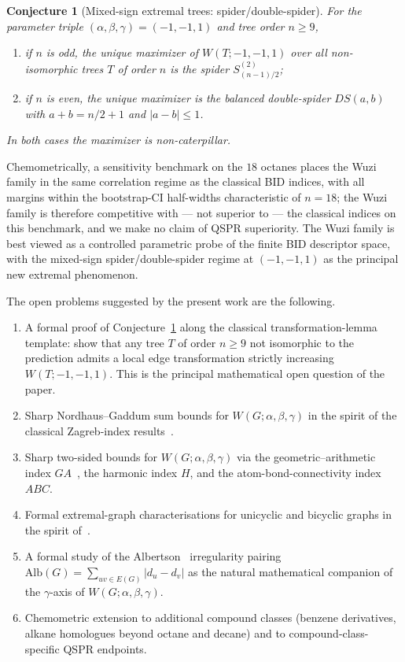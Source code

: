 \documentclass[a5paper, 10pt]{article}
\theoremstyle{plain}
\newtheorem{conjecture}{Conjecture}
\theoremstyle{remark}
\theoremstyle{definition}
\newcommand{\Wuzi}{W(G;\alpha,\beta,\gamma)}
\begin{document}
\begin{conjecture}[Mixed-sign extremal trees: spider/double-spider]\label{conj:caterpillar_max}
For the parameter triple $(\alpha, \beta, \gamma) = (-1, -1, 1)$
and tree order $n \ge 9$,
\begin{enumerate}[label=(\alph*)]
\item if $n$ is odd, the unique maximizer of $W(T; -1, -1, 1)$
over all non-isomorphic trees $T$ of order $n$ is the spider
$S^{(2)}_{(n - 1)/2}$;
\item if $n$ is even, the unique maximizer is the balanced
double-spider $DS(a, b)$ with $a + b = n/2 + 1$ and
$|a - b| \le 1$.
\end{enumerate}
In both cases the maximizer is non-caterpillar.
\end{conjecture}

Chemometrically, a sensitivity benchmark on the $18$ octanes
places the Wuzi family in the same correlation regime as the
classical BID indices, with all margins within the bootstrap-CI
half-widths characteristic of $n = 18$; the Wuzi family is
therefore competitive with --- not superior to --- the classical
indices on this benchmark, and we make no claim of QSPR
superiority. The Wuzi family is best viewed as a controlled
parametric probe of the finite BID descriptor space, with the
mixed-sign spider/double-spider regime at $(-1, -1, 1)$ as the
principal new extremal phenomenon.

The open problems suggested by the present work are the
following.
\begin{enumerate}
\item A formal proof of Conjecture~\ref{conj:caterpillar_max}
along the classical transformation-lemma template: show that any
tree $T$ of order $n \ge 9$ not isomorphic to the prediction
admits a local edge transformation strictly increasing
$W(T; -1, -1, 1)$. This is the principal mathematical open
question of the paper.
\item Sharp Nordhaus--Gaddum sum bounds for $\Wuzi$ in the spirit
of the classical Zagreb-index
results~\cite{NordhausGaddumOrig1956}.
\item Sharp two-sided bounds for $\Wuzi$ via the
geometric--arithmetic index
$GA$~\cite{VukicevicFurtula2009GA}, the harmonic index $H$, and
the atom-bond-connectivity index $ABC$.
\item Formal extremal-graph characterisations for unicyclic and
bicyclic graphs in the spirit of~\cite{LiuLuTian2008Randic,
HansenMelot2003unicyclicRandic}.
\item A formal study of the Albertson~\cite{Albertson1997}
irregularity pairing
$\mathrm{Alb}(G) = \sum_{uv \in E(G)} |d_u - d_v|$ as the natural
mathematical companion of the $\gamma$-axis of $\Wuzi$.
\item Chemometric extension to additional compound classes
(benzene derivatives, alkane homologues beyond octane and
decane) and to compound-class-specific QSPR endpoints.
\end{enumerate}
\end{document}
